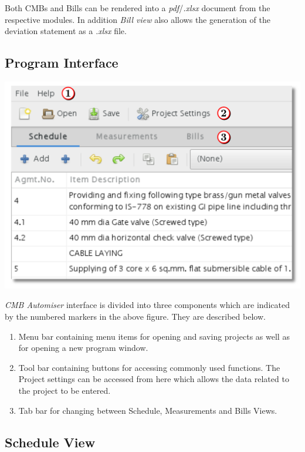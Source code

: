 \documentclass[twoside,a4paper]{refart}
\begin{document}
	 Both CMBs and Bills can be rendered into a \emph{pdf}/\emph{.xlsx} document from the respective modules. In addition \emph{Bill view} also allows the generation of the deviation statement as a \emph{.xlsx} file.
	 
	 \subsection{Program Interface}
	 
	 \begin{center}
	 	\includegraphics[width=1\linewidth]{screenshots/window_main.png}
	 \end{center}
	 
	 \emph{CMB Automiser} interface is divided into three components which are indicated by the numbered markers in the above figure. They are described below.
	 \begin{enumerate}
	 	\item Menu bar containing menu items for opening and saving projects as well as for opening a new program window. 
	 	\item Tool bar containing buttons for accessing commonly used functions. The Project settings can be accessed from here which allows the data related to the project to be entered.
	 	\item Tab bar for changing between Schedule, Measurements and Bills Views.
	 \end{enumerate}
	 
	 
	 
	 \subsection{Schedule View}
	 
\end{document}
